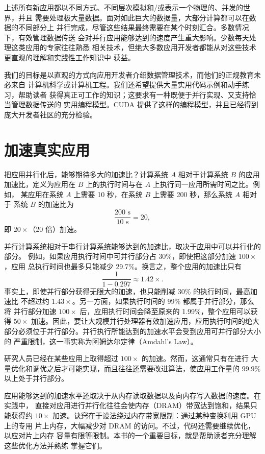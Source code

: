上述所有新应用都以不同方式、不同层次模拟和/或表示一个物理的、并发的世界，并且
需要处理极大量数据。面对如此巨大的数据量，大部分计算都可以在数据的不同部分上
并行完成，尽管这些结果最终需要在某个时刻汇合。多数情况下，有效管理数据传送
会对并行应用能够达到的速度产生重大影响。少数每天处理这类应用的专家往往熟悉
相关技术，但绝大多数应用开发者都能从对这些技术更直观的理解和实践性工作知识中
获益。

我们的目标是以直观的方式向应用开发者介绍数据管理技术，而他们的正规教育未必来自
计算机科学或计算机工程。我们还希望提供大量实用代码示例和动手练习，帮助读者
获得真正可工作的知识；这要求有一种既便于并行实现、又支持恰当管理数据传送的
实用编程模型。CUDA 提供了这样的编程模型，并且已经得到庞大开发者社区的充分检验。

\section{加速真实应用}
\label{sec:speeding-up-real-applications}

把应用并行化后，能够期待多大的加速比？计算系统 $A$ 相对于计算系统 $B$ 的应用
加速比，定义为应用在 $B$ 上的执行时间与在 $A$ 上执行同一应用所需时间之比。例如，
某应用在系统 $A$ 上需要 10 秒，在系统 $B$ 上需要 200 秒，那么系统 $A$ 相对于
系统 $B$ 的加速比为
\[
  \frac{200\text{ s}}{10\text{ s}}=20,
\]
即 $20\times$（20 倍）加速。

并行计算系统相对于串行计算系统能够达到的加速比，取决于应用中可以并行化的部分。
例如，如果应用执行时间中可并行部分占 30\%，即使把这部分加速 $100\times$，应用
总执行时间也最多只能减少 29.7\%。换言之，整个应用的加速比只有
\[
  \frac{1}{1-0.297}\approx 1.42\times.
\]
事实上，即使并行部分获得无限大的加速，也只能削减 30\% 的执行时间，最高加速比
不超过约 $1.43\times$。另一方面，如果执行时间的 99\% 都属于并行部分，那么将
并行部分加速 $100\times$ 后，应用执行时间会降至原来的 1.99\%，整个应用可以获得
$50\times$ 加速。因此，要让大规模并行处理器有效加速应用，应用执行时间的绝大
部分必须位于并行部分。并行执行所能达到的加速水平会受到应用可并行部分大小的
严重限制，这一事实称为阿姆达尔定律（Amdahl's Law）\cite{amdahl2013}。

研究人员已经在某些应用上取得超过 $100\times$ 的加速。然而，这通常只有在进行
大量优化和调优之后才可能实现，而且往往还需要改进算法，使应用工作量的
$99.9\%$ 以上处于并行部分。

应用能够达到的加速水平还取决于从内存读取数据以及向内存写入数据的速度。在实践中，
直接对应用进行并行化往往会使内存（DRAM）带宽达到饱和，结果只能获得约
$10\times$ 加速。诀窍在于设法绕过内存带宽限制：通过某种变换利用 GPU 上的专用
片上内存，大幅减少对 DRAM 的访问。不过，代码还需要继续优化，以应对片上内存
容量有限等限制。本书的一个重要目标，就是帮助读者充分理解这些优化方法并熟练
掌握它们。

